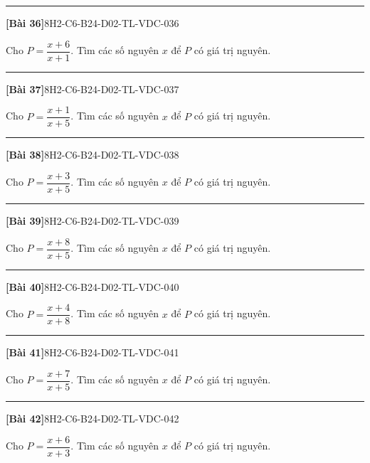 \documentclass[12pt,a4paper]{article}
\newif\ifloigiai
\newenvironment{cauhoi}[2]{%
  \par\medskip\noindent\rule{\textwidth}{0.4pt}\par\nopagebreak
  \noindent\textbf{[#1]}\hfill{\scriptsize\ttfamily #2}\par\nopagebreak\smallskip}{\par}
\newcommand{\loigiai}[1]{\ifloigiai\par\smallskip\noindent\textit{Lời giải.} #1\par\fi}
\begin{document}
\begin{cauhoi}{Bài 36}{8H2-C6-B24-D02-TL-VDC-036}
Cho $P=\dfrac{x+6}{x+1}$. Tìm các số nguyên $x$ để $P$ có giá trị nguyên.
\loigiai{Viết $P=\dfrac{(x+1)+5}{x+1}=1+\dfrac{5}{x+1}$. $P$ nguyên khi $x+1$ là ước của $5$, tức $x+1\in\{-5; -1; 1; 5\}$. Suy ra $x\in\{-6; -2; 0; 4\}$.}
\end{cauhoi}
\begin{cauhoi}{Bài 37}{8H2-C6-B24-D02-TL-VDC-037}
Cho $P=\dfrac{x+1}{x+5}$. Tìm các số nguyên $x$ để $P$ có giá trị nguyên.
\loigiai{Viết $P=\dfrac{(x+5)-4}{x+5}=1+\dfrac{-4}{x+5}$. $P$ nguyên khi $x+5$ là ước của $-4$, tức $x+5\in\{-4; -2; -1; 1; 2; 4\}$. Suy ra $x\in\{-9; -7; -6; -4; -3; -1\}$.}
\end{cauhoi}
\begin{cauhoi}{Bài 38}{8H2-C6-B24-D02-TL-VDC-038}
Cho $P=\dfrac{x+3}{x+5}$. Tìm các số nguyên $x$ để $P$ có giá trị nguyên.
\loigiai{Viết $P=\dfrac{(x+5)-2}{x+5}=1+\dfrac{-2}{x+5}$. $P$ nguyên khi $x+5$ là ước của $-2$, tức $x+5\in\{-2; -1; 1; 2\}$. Suy ra $x\in\{-7; -6; -4; -3\}$.}
\end{cauhoi}
\begin{cauhoi}{Bài 39}{8H2-C6-B24-D02-TL-VDC-039}
Cho $P=\dfrac{x+8}{x+5}$. Tìm các số nguyên $x$ để $P$ có giá trị nguyên.
\loigiai{Viết $P=\dfrac{(x+5)+3}{x+5}=1+\dfrac{3}{x+5}$. $P$ nguyên khi $x+5$ là ước của $3$, tức $x+5\in\{-3; -1; 1; 3\}$. Suy ra $x\in\{-8; -6; -4; -2\}$.}
\end{cauhoi}
\begin{cauhoi}{Bài 40}{8H2-C6-B24-D02-TL-VDC-040}
Cho $P=\dfrac{x+4}{x+8}$. Tìm các số nguyên $x$ để $P$ có giá trị nguyên.
\loigiai{Viết $P=\dfrac{(x+8)-4}{x+8}=1+\dfrac{-4}{x+8}$. $P$ nguyên khi $x+8$ là ước của $-4$, tức $x+8\in\{-4; -2; -1; 1; 2; 4\}$. Suy ra $x\in\{-12; -10; -9; -7; -6; -4\}$.}
\end{cauhoi}
\begin{cauhoi}{Bài 41}{8H2-C6-B24-D02-TL-VDC-041}
Cho $P=\dfrac{x+7}{x+5}$. Tìm các số nguyên $x$ để $P$ có giá trị nguyên.
\loigiai{Viết $P=\dfrac{(x+5)+2}{x+5}=1+\dfrac{2}{x+5}$. $P$ nguyên khi $x+5$ là ước của $2$, tức $x+5\in\{-2; -1; 1; 2\}$. Suy ra $x\in\{-7; -6; -4; -3\}$.}
\end{cauhoi}
\begin{cauhoi}{Bài 42}{8H2-C6-B24-D02-TL-VDC-042}
Cho $P=\dfrac{x+6}{x+3}$. Tìm các số nguyên $x$ để $P$ có giá trị nguyên.
\loigiai{Viết $P=\dfrac{(x+3)+3}{x+3}=1+\dfrac{3}{x+3}$. $P$ nguyên khi $x+3$ là ước của $3$, tức $x+3\in\{-3; -1; 1; 3\}$. Suy ra $x\in\{-6; -4; -2; 0\}$.}
\end{cauhoi}
\end{document}
